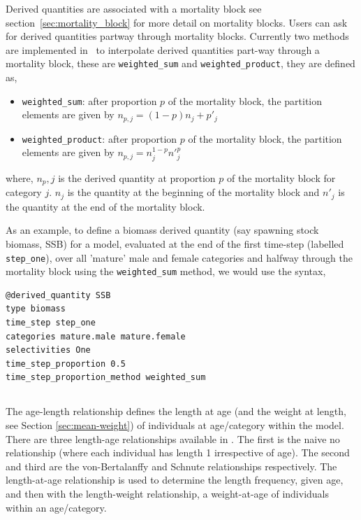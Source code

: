 Derived quantities are associated with a mortality block see section~\ref{sec:mortality_block} for more detail on mortality blocks. Users can ask for derived quantities partway through mortality blocks. Currently two methods are implemented in \CNAME\ to interpolate derived quantities part-way through a mortality block, these are \texttt{weighted\_sum} and \texttt{weighted\_product}, they are defined as,
\begin{itemize}
	\item \texttt{weighted\_sum}: after proportion $p$ of the mortality block, the partition elements are given by $n_{p,j} = (1 - p)n_j + p'_j$
	
	\item \texttt{weighted\_product}: after proportion $p$ of the mortality block, the partition elements are given by $n_{p,j} = n_j^{1-p} n'^p_j$
\end{itemize}
where, $n_p,j$ is the derived quantity at proportion $p$ of the mortality block for category $j$. $n_j$ is the quantity at the beginning of the mortality block and $n'_j$ is the quantity at the end of the mortality block.

As an example, to define a biomass derived quantity (say spawning stock biomass, SSB) for a model, evaluated at the end of the first time-step (labelled \texttt{step\_one}), over all 'mature' male and female categories and halfway through the mortality block using the \texttt{weighted\_sum} method, we would use the syntax,

{\small{\begin{verbatim}
@derived_quantity SSB
type biomass
time_step step_one
categories mature.male mature.female
selectivities One
time_step_proportion 0.5
time_step_proportion_method weighted_sum
\end{verbatim}}}

\subsection{\label{sec:age-at-age}}

The age-length relationship defines the length at age (and the weight at length, see Section \ref{sec:mean-weight}) of individuals at age/category within the model. There are three length-age relationships available in \CNAME. The first is the naive no relationship (where each individual has length 1 irrespective of age). The second  and third are the von-Bertalanffy and Schnute relationships respectively. The length-at-age relationship is used to determine the length frequency, given age, and then with the length-weight relationship, a weight-at-age of individuals within an age/category. 

